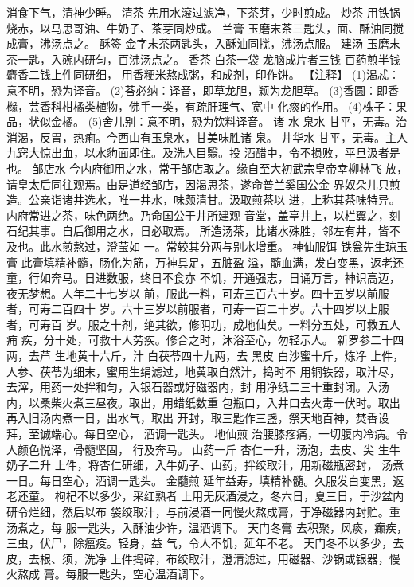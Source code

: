 \documentclass[12pt,UTF8]{ctexbook}
\begin{document}
消食下气，清神少睡。
清茶
先用水滚过滤净，下茶芽，少时煎成。
炒茶
用铁锅烧赤，以马思哥油、牛奶子、茶芽同炒成。
兰膏
玉磨末茶三匙头，面、酥油同搅成膏，沸汤点之。
酥签
金字末茶两匙头，入酥油同搅，沸汤点服。
建汤
玉磨末茶一匙，入碗内研匀，百沸汤点之。
香茶
白茶一袋 龙脑成片者三钱 百药煎半钱 麝香二钱上件同研细，
用香粳米熬成粥，和成剂，印作饼。
【注释】
(1)渴忒：意不明，恐为译音。
(2)荅必纳：译音，即草龙胆，颖为龙胆草。
(3)香圆：即香橼，芸香科柑橘类植物，佛手一类，有疏肝理气、宽中
化痰的作用。
(4)株子：果品，状似金橘。
(5)舍儿别：意不明，恐为饮料译音。
诸 水
泉水
甘平，无毒。治消渴，反胃，热痢。今西山有玉泉水，甘美味胜诸
泉。
井华水
甘平，无毒。主人九窍大惊出血，以水豿面即住。及洗人目翳。投
酒醋中，令不损败，平旦汲者是也。
邹店水
今内府御用之水，常于邹店取之。缘自至大初武宗皇帝幸柳林飞
放，请皇太后同往观焉。由是道经邹店，因渴思茶，遂命普兰奚国公金
界奴朵儿只煎造。公亲诣诸井选水，唯一井水，味颇清甘。汲取煎茶以
进，上称其茶味特异。内府常进之茶，味色两绝。乃命国公于井所建观
音堂，盖亭井上，以栏翼之，刻石纪其事。自后御用之水，日必取焉。
所造汤茶，比诸水殊胜，邻左有井，皆不及也。此水煎熬过，澄莹如
一。常较其分两与别水增重。
神仙服饵
铁瓮先生琼玉膏 此膏填精补髓，肠化为筋，万神具足，五脏盈
溢，髓血满，发白变黑，返老还童，行如奔马。日进数服，终日不食亦
不饥，开通强志，日诵万言，神识高迈，夜无梦想。人年二十七岁以
前，服此一料，可寿三百六十岁。四十五岁以前服者，可寿二百四十
岁。六十三岁以前服者，可寿一百二十岁。六十四岁以上服者，可寿百
岁。服之十剂，绝其欲，修阴功，成地仙矣。一料分五处，可救五人痈
疾，分十处，可救十人劳疾。修合之时，沐浴至心，勿轻示人。
新罗参二十四两，去芦 生地黄十六斤，汁 白茯苓四十九两，去
黑皮 白沙蜜十斤，炼净
上件，人参、茯苓为细末，蜜用生绢滤过，地黄取自然汁，捣时不
用铜铁器，取汁尽，去滓，用药一处拌和匀，入银石器或好磁器内，封
用净纸二三十重封闭。入汤内，以桑柴火煮三昼夜。取出，用蜡纸数重
包瓶口，入井口去火毒一伏时。取出再入旧汤内煮一日，出水气，取出
开封，取三匙作三盏，祭天地百神，焚香设拜，至诚端心。每日空心，
酒调一匙头。
地仙煎 治腰膝疼痛，一切腹内冷病。令人颜色悦泽，骨髓坚固，
行及奔马。
山药一斤 杏仁一升，汤泡，去皮、尖 生牛奶子二升
上件，将杏仁研细，入牛奶子、山药，拌绞取汁，用新磁瓶密封，
汤煮一日。每日空心，酒调一匙头。
金髓煎 延年益寿，填精补髓。久服发白变黑，返老还童。
枸杞不以多少，采红熟者
上用无灰酒浸之，冬六日，夏三日，于沙盆内研令烂细，然后以布
袋绞取汁，与前浸酒一同慢火熬成膏，于净磁器内封贮。重汤煮之，每
服一匙头，入酥油少许，温酒调下。
天门冬膏 去积聚，风痰，癫疾，三虫，伏尸，除瘟疫。轻身，益
气，令人不饥，延年不老。
天门冬不以多少，去皮，去根、须，洗净
上件捣碎，布绞取汁，澄清滤过，用磁器、沙锅或银器，慢火熬成
膏。每服一匙头，空心温酒调下。
\end{document}
